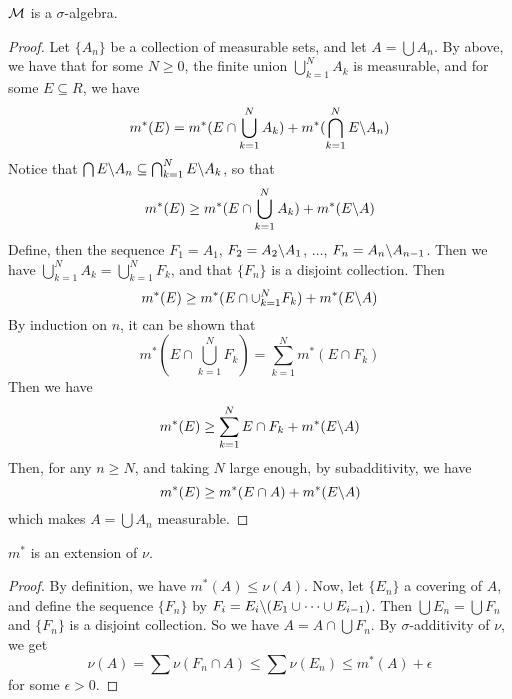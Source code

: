 \begin{corollary}
    $\mathcal{M}$ is a  $\sigma$-algebra.
\end{corollary}
\begin{proof}
    Let $\{A_n\}$ be a collection of measurable sets, and let $A=\bigcup{A_n}$.
    By above, we have that for some $N \geq 0$, the finite union
    $\bigcup_{k=1}^N{A_k}$ is measurable, and for some $E \subseteq R$, we have
    \begin{equation*}
        m^*(E)=m^*(E \cap \bigcup_{k=1}^N{A_k})+m^*(\bigcap_{k=1}^N{E\backslash A_n})
    \end{equation*}
    Notice that $\bigcap{E\backslash A_n} \subseteq \bigcap_{k=1}^N{E\backslash A_k}$,
    so that
    \begin{equation*}
        m^*(E) \geq m^*(E \cap \bigcup_{k=1}^N{A_k})+m^*(E\backslash A)
    \end{equation*}
    Define, then the sequence $F_1=A_1$, $F_2=A_2\backslash A_1$, $\dots$,
    $F_n=A_n\backslash A_{n-1}$. Then we have
    $\bigcup_{k=1}^N{A_k}=\bigcup_{k=1}^N{F_k}$, and that $\{F_n\}$ is a
    disjoint collection. Then
    \begin{equation*}
        m^*(E) \geq m^*(E \cap \cup_{k=1}^N{F_k})+m^*(E\backslash A)
    \end{equation*}
    By induction on $n$, it can be shown that
    \begin{equation*}
        m^*(E \cap \bigcup_{k=1}^N{F_k})=\sum_{k=1}^N{m^*(E \cap F_k)}
    \end{equation*}
    Then we have
    \begin{equation*}
        m^*(E) \geq \sum_{k=1}^N{E \cap F_k}+m^*(E\backslash A)
    \end{equation*}
    Then, for any $n \geq N$, and taking  $N$ large enough, by subadditivity,
    we have
    \begin{equation*}
        m^*(E) \geq m^*(E \cap A)+m^*(E\backslash A)
    \end{equation*}
    which makes $A=\bigcup{A_n}$ measurable.
\end{proof}
\begin{corollary}
    $m^*$ is an extension of $\nu$.
\end{corollary}
\begin{proof}
    By definition, we have $m^*(A) \leq \nu(A)$. Now, let $\{E_n\}$ a covering
    of $A$, and define the sequence $\{F_n\}$ by $F_i=E_i\backslash(E_1 \cup \dots
    \cup E_{i-1})$. Then $\bigcup{E_n}=\bigcup{F_n}$ and $\{F_n\}$ is a
    disjoint collection. So we have $A=A \cap \bigcup{F_n}$. By
    $\sigma$-additivity of  $\nu$, we get
    \begin{equation*}
        \nu(A)=\sum{\nu(F_n \cap A)} \leq \sum{\nu(E_n)} \leq m^*(A)+\epsilon
    \end{equation*}
    for some $\epsilon>0$.
\end{proof}
